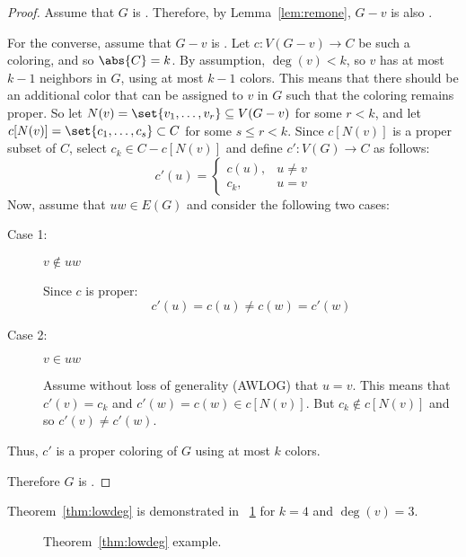 \begin{proof}
  Assume that \(G\) is .  Therefore, by Lemma~\ref{lem:remone}, \(G-v\) is also .

  For the converse, assume that \(G-v\) is .  Let \(c:V(G-v)\to C\) be such a coloring, and so
  \(\abs{C}=k\).  By assumption, \(\deg(v)<k\), so \(v\) has at most \(k-1\) neighbors in \(G\), using at most
  \(k-1\) colors.  This means that there should be an additional color that can be assigned to \(v\) in \(G\) such
  that the coloring remains proper.  So let \(N(v)=\set{v_1,\ldots,v_r}\subseteq V(G-v)\) for some \(r<k\), and let
  \(c[N(v)]=\set{c_1,\ldots,c_s}\subset C\) for some \(s\le r<k\).  Since \(c[N(v)]\) is a proper subset of \(C\),
  select \(c_k\in C-c[N(v)]\) and define \(c':V(G)\to C\) as follows:
  \[c'(u)=\begin{cases}
  c(u), & u\ne v \\
  c_k, & u=v
  \end{cases}\]
  Now, assume that \(uw\in E(G)\) and consider the following two cases:
  \begin{description}
  \item[Case 1:] \(v\notin uw\)

    Since \(c\) is proper:
    \[c'(u)=c(u)\ne c(w)=c'(w)\]
  \item[Case 2:] \(v\in uw\)

    Assume without loss of generality (AWLOG) that \(u=v\).  This means that \(c'(v)=c_k\) and \(c'(w)=c(w)\in
    c[N(v)]\).  But \(c_k\notin c[N(v)]\) and so \(c'(v)\ne c'(w)\).
  \end{description}
  Thus, \(c'\) is a proper coloring of \(G\) using at most \(k\) colors.

  Therefore \(G\) is .
\end{proof}

Theorem~\ref{thm:lowdeg} is demonstrated in \figurename~\ref{fig:lowdeg} for \(k=4\) and \(\deg(v)=3\).

\begin{figure}[H]
  \centering
  \caption{Theorem~\ref{thm:lowdeg} example.}
  \label{fig:lowdeg}
\end{figure}

